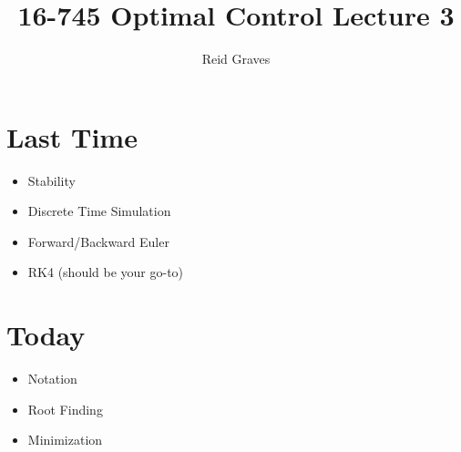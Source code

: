 \documentclass[11pt]{article}
\title{16-745 Optimal Control Lecture 3}
\author{Reid Graves}
\begin{document}
\maketitle

\section{Last Time}
\begin{itemize}
    \item Stability
    \item Discrete Time Simulation
    \item Forward/Backward Euler
    \item RK4 (should be your go-to)
\end{itemize}

\section{Today}
\begin{itemize}
    \item Notation
    \item Root Finding
    \item Minimization
\end{itemize}
\end{document}

